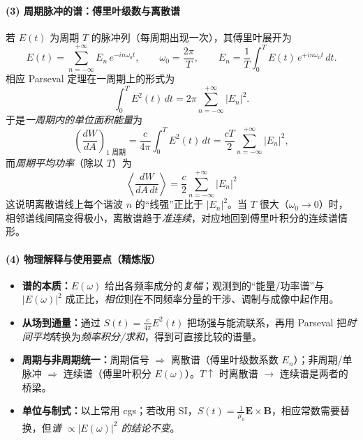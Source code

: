 \paragraph{(3) 周期脉冲的谱：傅里叶级数与离散谱}
若 $E(t)$ 为周期 $T$ 的脉冲列（每周期出现一次），其傅里叶展开为
\begin{equation}
  E(t)=\sum_{n=-\infty}^{+\infty} E_n\,e^{-in\omega_0 t},
  \qquad
  \omega_0=\frac{2\pi}{T},
  \qquad
  E_n=\frac{1}{T}\int_0^T E(t)\,e^{+in\omega_0 t}\,dt .
\end{equation}
相应 Parseval 定理在一周期上的形式为
\begin{equation}
  \int_0^T E^2(t)\,dt
  = 2\pi \sum_{n=-\infty}^{+\infty} |E_n|^2 .
\end{equation}
于是\emph{一周期内的单位面积能量}为
\begin{equation}
  \left(\frac{dW}{dA}\right)_{\!\text{1 周期}}
  = \frac{c}{4\pi}\int_0^T E^2(t)\,dt
  = \frac{cT}{2}\sum_{n=-\infty}^{+\infty}|E_n|^2 ,
\end{equation}
而\emph{周期平均功率}（除以 $T$）为
\begin{equation}
  \boxed{\;
  \left\langle \frac{dW}{dA\,dt}\right\rangle
  = \frac{c}{2} \sum_{n=-\infty}^{+\infty}|E_n|^2 \;}
\end{equation}
这说明离散谱线上每个谐波 $n$ 的“线强”正比于 $|E_n|^2$。当 $T$ 很大（$\omega_0\!\to\!0$）时，相邻谱线间隔变得极小，离散谱趋于\emph{准连续}，对应地回到傅里叶积分的连续谱情形。

\paragraph{(4) 物理解释与使用要点（精炼版）}
\begin{itemize}[leftmargin=2em]
  \item \textbf{谱的本质：}$E(\omega)$ 给出各频率成分的\emph{复幅}；观测到的“能量/功率谱”与 $|E(\omega)|^2$ 成正比，\emph{相位}则在不同频率分量的干涉、调制与成像中起作用。
  \item \textbf{从场到通量：}通过 $S(t)=\frac{c}{4\pi}E^2(t)$ 把场强与能流联系，再用 Parseval 把\emph{时间平均}转换为\emph{频率积分/求和}，得到可直接比较的谱量。
  \item \textbf{周期与非周期统一：}周期信号 $\Rightarrow$ 离散谱（傅里叶级数系数 $E_n$）；非周期/单脉冲 $\Rightarrow$ 连续谱（傅里叶积分 $E(\omega)$）。$T\!\uparrow$ 时离散谱 $\to$ 连续谱是两者的桥梁。
  \item \textbf{单位与制式：}以上常用 cgs；若改用 SI，$S(t)=\frac{1}{\mu_0}\mathbf{E}\times\mathbf{B}$，相应常数需要替换，但\emph{谱 $\propto |E(\omega)|^2$ 的结论不变}。
\end{itemize}

